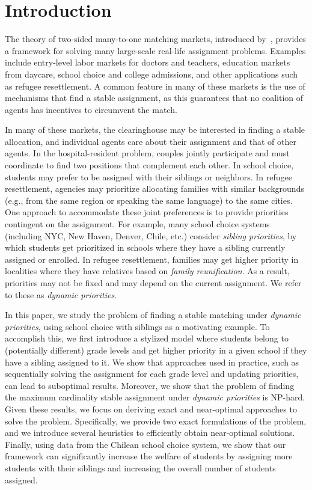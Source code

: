 \section{Introduction}


The theory of two-sided many-to-one matching markets, introduced by~\cite{gale1962college}, provides a framework for solving many large-scale real-life assignment problems. Examples include entry-level labor markets for doctors and teachers, education markets from daycare, school choice and college admissions, and other applications such as refugee resettlement. A common feature in many of these markets is the use of mechanisms that find a stable assignment, as this guarantees that no coalition of agents has incentives to circumvent the match.

In many of these markets, the clearinghouse may be interested in finding a stable allocation, and individual agents care about their assignment and that of other agents. In the hospital-resident problem, couples jointly participate and must coordinate to find two positions that complement each other. In school choice, students may prefer to be assigned with their siblings or neighbors. In refugee resettlement, agencies may prioritize allocating families with similar backgrounds (e.g., from the same region or speaking the same language) to the same cities. One approach to accommodate these joint preferences is to provide priorities contingent on the assignment. For example, many school choice systems (including NYC, New Haven, Denver, Chile, etc.) consider \emph{sibling priorities}, by which students get prioritized in schools where they have a sibling currently assigned or enrolled. In refugee resettlement, families may get higher priority in localities where they have relatives based on \emph{family reunification}. As a result, priorities may not be fixed and may depend on the current assignment. We refer to these as \emph{dynamic priorities}.

In this paper, we study the problem of finding a stable matching under \emph{dynamic priorities}, using school choice with siblings as a motivating example. To accomplish this, we first introduce a stylized model where students belong to (potentially different) grade levels and get higher priority in a given school if they have a sibling assigned to it. We show that approaches used in practice, such as sequentially solving the assignment for each grade level and updating priorities, can lead to suboptimal results. Moreover, we show that the problem of finding the maximum cardinality stable assignment under \emph{dynamic priorities} is NP-hard.
Given these results, we focus on deriving exact and near-optimal approaches to solve the problem. Specifically, we provide two exact formulations of the problem, and we introduce several heuristics to efficiently obtain near-optimal solutions. Finally, using data from the Chilean school choice system, we show that our framework can significantly increase the welfare of students by assigning more students with their siblings and increasing the overall number of students assigned.


